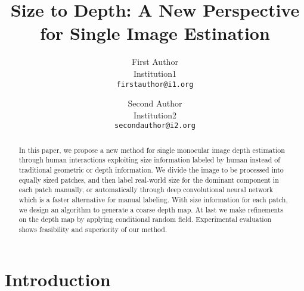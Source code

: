 \documentclass[10pt,twocolumn,letterpaper]{article}
\begin{document}
\title{Size to Depth: A New Perspective for Single Image Estination}

\author{First Author \\
Institution1\\
{\tt\small firstauthor@i1.org}
\and
Second Author \\
Institution2\\
{\tt\small secondauthor@i2.org}
}

\maketitle
\ifwacvfinal\thispagestyle{empty}\fi

\begin{abstract}
   In this paper, we propose a new method for single monocular image depth estimation through human interactions exploiting size information labeled by human instead of traditional geometric or depth information. We divide the image to be processed into equally sized patches, and then label real-world size for the dominant component in each patch manually, or automatically through deep convolutional neural network which is a faster alternative for manual labeling. With size information for each patch, we design an algorithm to generate a coarse depth map. At last we make refinements on the depth map by applying conditional random field. Experimental evaluation shows feasibility and superiority of our method.
\end{abstract}

\section{Introduction}
\end{document}
